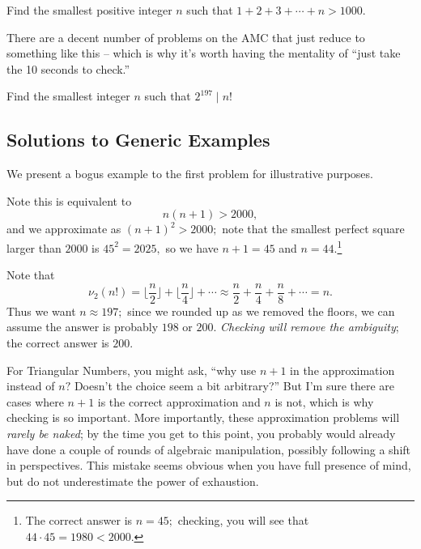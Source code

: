 \documentclass[mast]{lucky}
\begin{document}
\begin{exam}
Find the smallest positive integer $n$ such that $1+2+3+\cdots+n>1000.$
\end{exam}

There are a decent number of problems on the AMC that just reduce to something like this -- which is why it's worth having the mentality of ``just take the 10 seconds to check.''

\begin{exam}
Find the smallest integer $n$ such that $2^{197}\mid n!$
\end{exam}

\pagebreak

\subsection{Solutions to Generic Examples}

We present a bogus example to the first problem for illustrative purposes.

\begin{sol}
Note this is equivalent to
\[n(n+1)>2000,\]
and we approximate as $(n+1)^2>2000;$ note that the smallest perfect square larger than $2000$ is $45^2=2025,$ so we have $n+1=45$ and $n=44.$\footnote{The correct answer is $n=45;$ checking, you will see that $44\cdot 45=1980<2000.$}
\end{sol}

\begin{sol}
Note that
\[\nu_2(n!)=\lfloor\frac{n}{2}\rfloor+\lfloor\frac{n}{4}\rfloor+\cdots\approx \frac{n}{2}+\frac{n}{4}+\frac{n}{8}+\cdots=n.\]
Thus we want $n\approx 197;$ since we rounded up as we removed the floors, we can assume the answer is probably $198$ or $200.$ \emph{Checking will remove the ambiguity}; the correct answer is $200.$
\end{sol}

For Triangular Numbers, you might ask, ``why use $n+1$ in the approximation instead of $n?$ Doesn't the choice seem a bit arbitrary?'' But I'm sure there are cases where $n+1$ is the correct approximation and $n$ is not, which is why checking is so important. More importantly, these approximation problems will \emph{rarely be naked}; by the time you get to this point, you probably would already have done a couple of rounds of algebraic manipulation, possibly following a shift in perspectives. This mistake seems obvious when you have full presence of mind, but do not underestimate the power of exhaustion.
\end{document}
